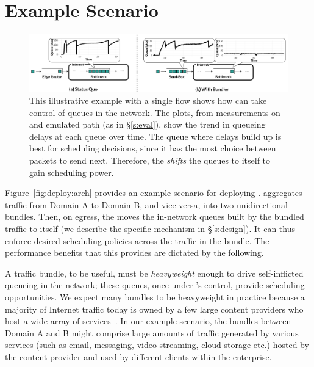 \section{Example Scenario}\label{s:deploy}
\begin{figure}[t]
    \centering
    \includegraphics[width=\textwidth]{img/shift-bottleneck-combined}
    \caption{This illustrative example with a single flow shows how \name can take control of queues in the network. The plots, from measurements on and emulated path (as in \S\ref{s:eval}), show the trend in queueing delays at each queue over time. The queue where delays build up is best for scheduling decisions, since it has the most choice between packets to send next. Therefore, the \inbox \emph{shifts} the queues to itself to gain scheduling power.}\label{fig:design:shift-bottleneck}
\end{figure}
%


Figure~\ref{fig:deploy:arch} provides an example scenario for deploying \name. 
\name aggregates traffic from Domain A to Domain B, and vice-versa, into two unidirectional bundles. 
Then, on egress, the \inbox moves the in-network queues built by the bundled traffic to itself (we describe the specific mechanism in \S\ref{s:design}). 
It can thus enforce desired scheduling policies across the traffic in the bundle.
The performance benefits that this provides are dictated by the following.

A traffic bundle, to be useful, must be \emph{heavyweight} enough to drive self-inflicted queueing in the network; these queues, once under \name's control, provide scheduling opportunities. We expect many bundles to be heavyweight in practice because a majority of Internet traffic today is owned by a few large content providers who host a wide array of services~\cite{fivecomps, labovitz}. 
In our example scenario, the bundles between Domain A and B might comprise large amounts of traffic generated by various services (such as email, messaging, video streaming, cloud storage etc.) hosted by the content provider and used by different clients within the enterprise. 

